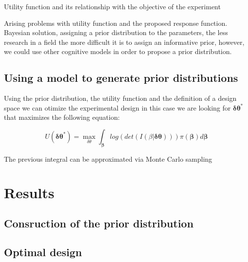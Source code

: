 \documentclass[preprint,review,12pt]{elsarticle}
\begin{document}
Utility function and its relationship with the objective of the experiment

Arising problems with utility function and the proposed response function. Bayesian solution, assigning a prior distribution to the parameters, the less research in a field the more difficult it is to assign an informative prior, however, we could use other cognitive models in order to propose a prior distribution. 
\subsection{Using a model to generate prior distributions}

Using the prior distribution, the utility function and the definition of a design space we can otimize the experimental design in this case we are looking for \begin{math}\mathbf{\delta\theta}^{*}\end{math} that maximizes the following equation:

\begin{equation}
U(\mathbf{\delta\theta}^{*})=\max_{\delta\theta} \int_{\mathbf{\beta}} log(det(I(\beta|\mathbf{\delta\theta}))) \pi(\mathbf{\beta}) d\mathbf{\beta}
\end{equation}

The previous integral can be approximated via Monte Carlo sampling

\section{Results}
\label{S:3}

\subsection{Consruction of the prior distribution}


\subsection{Optimal design}
\end{document}

